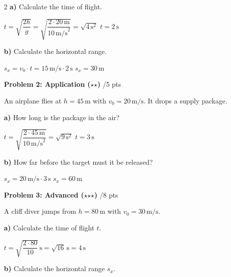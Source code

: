 \documentclass[10pt, a4paper]{article}
\newcommand{\fachfarbe}{physik}
\newcommand{\stmark}{$\star$}
\newcommand{\abschnitt}[1]{%
    \vspace{8pt}
    \noindent\textbf{\textcolor{\fachfarbe}{#1}}
    \vspace{4pt}
}
\newcommand{\punkte}[1]{\hfill\small\textcolor{grau}{/#1 pts}}
\begin{document}
\begin{multicols}{2}
\textbf{a)} Calculate the time of flight.

\textcolor{loesung}{$t = \sqrt{\dfrac{2h}{g}} = \sqrt{\dfrac{2 \cdot 20\,\text{m}}{10\,\text{m/s}^2}} = \sqrt{4\,\text{s}^2}$ \quad $\boxed{t = 2\,\text{s}}$}

\vspace{4pt}

\textbf{b)} Calculate the horizontal range.

\textcolor{loesung}{$s_x = v_0 \cdot t = 15\,\text{m/s} \cdot 2\,\text{s}$ \quad $\boxed{s_x = 30\,\text{m}}$}

\vspace{4pt}


\abschnitt{Problem 2: Application (\stmark\stmark)}\punkte{5}

An airplane flies at $h = 45\,\text{m}$ with $v_0 = 20\,\text{m/s}$. It drops a supply package.

\textbf{a)} How long is the package in the air?

\textcolor{loesung}{$t = \sqrt{\dfrac{2 \cdot 45\,\text{m}}{10\,\text{m/s}^2}} = \sqrt{9\,\text{s}^2}$ \quad $\boxed{t = 3\,\text{s}}$}

\vspace{4pt}

\textbf{b)} How far before the target must it be released?

\textcolor{loesung}{$s_x = 20\,\text{m/s} \cdot 3\,\text{s}$ \quad $\boxed{s_x = 60\,\text{m}}$}

\vspace{4pt}


\abschnitt{Problem 3: Advanced (\stmark\stmark\stmark)}\punkte{8}

A cliff diver jumps from $h = 80\,\text{m}$ with $v_0 = 30\,\text{m/s}$.

\textbf{a)} Calculate the time of flight $t$.

\textcolor{loesung}{$t = \sqrt{\dfrac{2 \cdot 80}{10}}\,\text{s} = \sqrt{16}\,\text{s} = \boxed{4\,\text{s}}$}

\vspace{2pt}

\textbf{b)} Calculate the horizontal range $s_x$.


\end{multicols}
\end{document}
